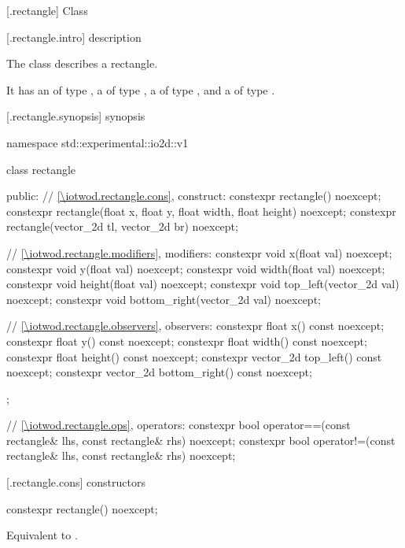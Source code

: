  [\iotwod.rectangle] {Class }

 [\iotwod.rectangle.intro] { description}

%
\pnum
The class  describes a rectangle.

\pnum
It has an  of type , a  of type , a  of type , and a  of type .

 [\iotwod.rectangle.synopsis] { synopsis}

\begin{codeblock}
namespace std::experimental::io2d::v1 {
  class rectangle {
  public:
    // \ref{\iotwod.rectangle.cons}, construct:
    constexpr rectangle() noexcept;
    constexpr rectangle(float x, float y, float width, float height)
      noexcept;
    constexpr rectangle(vector_2d tl, vector_2d br) noexcept;

    // \ref{\iotwod.rectangle.modifiers}, modifiers:
    constexpr void x(float val) noexcept;
    constexpr void y(float val) noexcept;
    constexpr void width(float val) noexcept;
    constexpr void height(float val) noexcept;
    constexpr void top_left(vector_2d val) noexcept;
    constexpr void bottom_right(vector_2d val) noexcept;
    
    // \ref{\iotwod.rectangle.observers}, observers:
    constexpr float x() const noexcept;
    constexpr float y() const noexcept;
    constexpr float width() const noexcept;
    constexpr float height() const noexcept;
    constexpr vector_2d top_left() const noexcept;
    constexpr vector_2d bottom_right() const noexcept;
  };
  
  // \ref{\iotwod.rectangle.ops}, operators:
  constexpr bool operator==(const rectangle& lhs, const rectangle& rhs) 
    noexcept;
  constexpr bool operator!=(const rectangle& lhs, const rectangle& rhs) 
    noexcept;
}
\end{codeblock}

 [\iotwod.rectangle.cons] { constructors}

%
\begin{itemdecl}
constexpr rectangle() noexcept;
\end{itemdecl}
\begin{itemdescr}
\pnum
\effects
Equivalent to .
\end{itemdescr}

